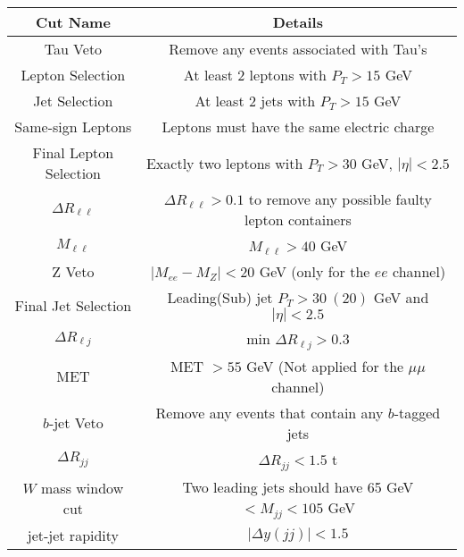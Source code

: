 
\begin{tabular}{|c||c|}
	\hline
      Cut Name & Details \\
      \hline
      \hline
      Tau Veto & Remove any events associated with Tau's \\
      \hline
      Lepton Selection & At least 2 leptons with $P_T> 15$ GeV  \\
      \hline
      Jet Selection & At least 2 jets with $P_T> 15$ GeV \\
      \hline
      Same-sign Leptons & Leptons must have the same electric charge \\
      \hline
      Final Lepton Selection & Exactly two leptons with $P_T > 30$ GeV, $|\eta|<2.5$ \\
      \hline
      $\Delta R_{\ell \ell}$ & $\Delta R_{\ell \ell} > 0.1$ to remove any possible faulty lepton containers \\
      \hline
      $M_{\ell \ell}$ & $M_{\ell \ell} > 40$ GeV \\
      \hline
      Z Veto & $ | M_{ee} - M_Z | < 20$ GeV (only for the $ee$ channel) \\
      \hline
      Final Jet Selection & Leading(Sub) jet $P_T> 30~(20)$ GeV and $|\eta| < 2.5$ \\
      \hline
      $\Delta R_{\ell j}$ & min $\Delta R_{\ell j} > 0.3$ \\
      \hline
      MET & MET $ > 55$ GeV (Not applied for the $\mu\mu$ channel) \\
      \hline
      $b$-jet Veto & Remove any events that contain any $b$-tagged jets \\
      \hline
      $\Delta R_{jj}$ & $\Delta R_{j j} < 1.5$ t\\ 
      \hline
      $W$ mass window cut & Two leading jets should have 65 GeV $<M_{jj}<105$ GeV  \\
      \hline
      jet-jet rapidity & $|\Delta y(jj)| < 1.5$ \\
      \hline

\end{tabular}

